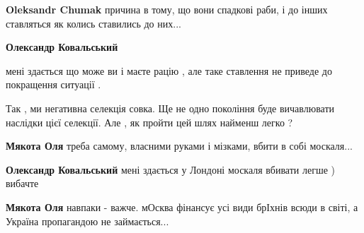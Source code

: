 \begin{itemize}
\begin{itemize}
 
\textbf{Oleksandr Chumak} причина в тому, що вони спадкові раби, і до інших ставляться як колись ставились до них...

 
\textbf{Олександр Ковальський} 

мені здається що може ви і маєте рацію , але таке ставлення не приведе до
покращення ситуації .

Так , ми негативна селекція совка. Ще не одно покоління буде вичавлювати
наслідки цієї селекції. Але , як пройти цей шлях найменш легко ?

 
\textbf{Мякота Оля} треба самому, власними руками і мізками, вбити в собі москаля...

 
\textbf{Олександр Ковальський} мені здається у Лондоні москаля вбивати легше ) вибачте

 
\textbf{Мякота Оля} навпаки - важче. мОсква фінансує усі види брІхнів всюди в світі, а Україна пропагандою не займається...

 

\end{itemize}
\end{itemize}
